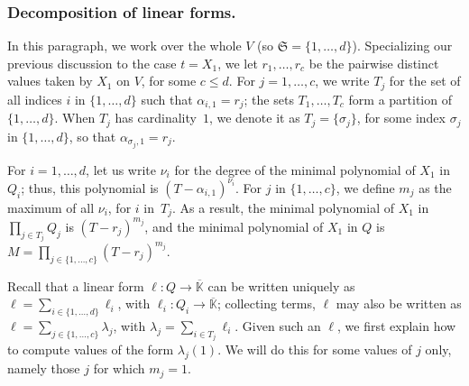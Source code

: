 \documentclass[12pt]{article}
\def\Kbar {{\ensuremath{\overline{\mathbb{K}}}}}
\begin{document}
\subsubsection{Decomposition of linear forms.}

In this paragraph, we work over the whole $V$ (so
$\mathfrak{S}=\{1,\dots,d\}$).  Specializing our previous discussion
to the case $t=X_1$, we let $r_1,\dots,r_c$ be the pairwise distinct
values taken by $X_1$ on $V$, for some $c \le d$.  For
$j=1,\dots,c$, we write $T_j$ for the set of all indices $i$ in
$\{1,\dots,d\}$ such that $\alpha_{i,1}=r_j$; the sets $T_1,\dots,T_c$
form a partition of $\{1,\dots,d\}$. When $T_j$ has cardinality~$1$,
we denote it as $T_j=\{\sigma_j\}$, for some index $\sigma_j$ in
$\{1,\dots,d\}$, so that $\alpha_{\sigma_j,1}=r_j$.

For $i=1,\dots,d$, let us write $\nu_i$ for the degree of the minimal
polynomial of $X_1$ in $Q_i$; thus, this polynomial is
$(T-\alpha_{i,1})^{\nu_i}$. For $j$ in $\{1,\dots,c\}$, we define
$m_j$ as the maximum of all $\nu_i$, for $i$ in~$T_j$. As a result, the minimal
polynomial of $X_1$ in $\prod_{j \in T_j} Q_j$ is 
$(T-r_j)^{m_j}$, and the minimal polynomial of $X_1$ in $Q$ is
$M=\prod_{j \in \{1,\dots,c\}} (T-r_j)^{m_j}$.

Recall that a linear form $\ell: Q \to \Kbar$ can be written uniquely
as $\ell=\sum_{i\in \{1,\dots,d\}} \ell_i$, with $\ell_i:Q_i \to
\Kbar$; collecting terms, $\ell$ may also be written as $\ell=\sum_{j
	\in \{1,\dots,c\}} \lambda_j$, with $\lambda_j=\sum_{i \in T_j}
\ell_i$.  Given such an $\ell$, we first explain how to compute values
of the form $\lambda_j(1)$. We will do this for some values of $j$
only, namely those $j$ for which $m_j=1$.
\end{document}
